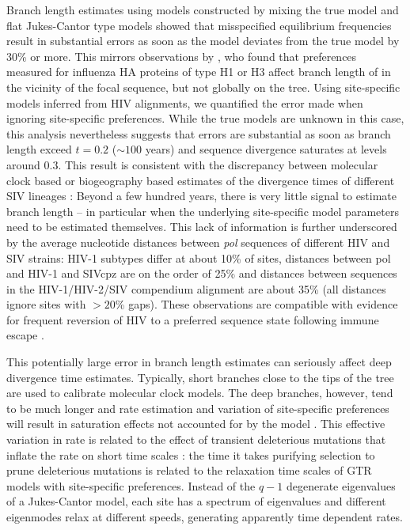 \documentclass[aps,rmp,twocolumn,linenumbers]{revtex4-1}
\newcommand{\gene}[1]{{\it #1}}
\begin{document}
Branch length estimates using models constructed by mixing the true model and flat Jukes-Cantor type models showed that misspecified equilibrium frequencies result in substantial errors as soon as the model deviates from the true model by 30\% or more.
This mirrors observations by \citet{hilton_modeling_2018}, who found that preferences measured for influenza HA proteins of type H1 or H3 affect branch length of in the vicinity of the focal sequence, but not globally on the tree.
Using site-specific models inferred from HIV alignments, we quantified the error made when ignoring site-specific preferences.
While the true models are unknown in this case, this analysis nevertheless suggests that errors are substantial as soon as branch length exceed $t=0.2$ ($\sim 100$ years) and sequence divergence saturates at levels around 0.3.
This result is consistent with the discrepancy between molecular clock based or biogeography based estimates of the divergence times of different SIV lineages \citep{worobey_island_2010}:
Beyond a few hundred years, there is very little signal to estimate branch length -- in particular when the underlying site-specific model parameters need to be estimated themselves.
This lack of information is further underscored by the average nucleotide distances between \gene{pol} sequences of different HIV and SIV strains:  HIV-1 subtypes differ at about 10\% of sites, distances between pol and HIV-1 and SIVcpz are on the order of 25\% and distances between sequences in the HIV-1/HIV-2/SIV compendium alignment are about 35\% (all distances ignore sites with $>20$\% gaps).
These observations are compatible with evidence for frequent reversion of HIV to a preferred sequence state following immune escape \citep{zanini2015population,carlson_selection_2014,leslie_hiv_2004}.


This potentially large error in branch length estimates can seriously affect deep divergence time estimates.
Typically, short branches close to the tips of the tree are used to calibrate molecular clock models.
The deep branches, however, tend to be much longer and rate estimation and variation of site-specific preferences will result in saturation effects not accounted for by the model \citep{hilton_modeling_2018}.
This effective variation in rate is related to the effect of transient deleterious mutations that inflate the rate on short time scales \citep{ho_time_2005,wertheim_purifying_2011}: the time it takes purifying selection to prune deleterious mutations is related to the relaxation time scales of GTR models with site-specific preferences.
Instead of the $q-1$ degenerate eigenvalues of a Jukes-Cantor model, each site has a spectrum of eigenvalues and different eigenmodes relax at different speeds, generating apparently time dependent rates.
\end{document}
